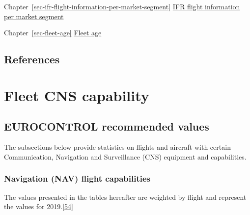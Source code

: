 \documentclass[
  11pt,
  a4paper,
]{book}
\begin{document}
Chapter~\ref{sec-ifr-flight-information-per-market-segment}
\protect\hyperlink{sec-ifr-flight-information-per-market-segment}{IFR
flight information per market segment}

Chapter~\ref{sec-fleet-age} \protect\hyperlink{sec-fleet-age}{Fleet age}

\hypertarget{references-24}{%
\section{References}\label{references-24}}

\hypertarget{sec-fleet-cns-capability}{%
\chapter{Fleet CNS capability}\label{sec-fleet-cns-capability}}

\hypertarget{eurocontrol-recommended-values-23}{%
\section{EUROCONTROL recommended
values}\label{eurocontrol-recommended-values-23}}

The subsections below provide statistics on flights and aircraft with
certain Communication, Navigation and Surveillance (CNS) equipment and
capabilities.

\hypertarget{navigation-nav-flight-capabilities}{%
\subsection{Navigation (NAV) flight
capabilities}\label{navigation-nav-flight-capabilities}}

The values presented in the tables hereafter are weighted by flight and
represent the values for
2019.\protect\hyperlink{ref-cns:dashboard}{{[}54{]}}
\end{document}
